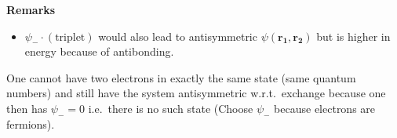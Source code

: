 \newpar{}
\textbf{Remarks}
\begin{itemize}
    \item $\psi_{-}\cdot \left(\text{triplet}\right)$ would also lead to antisymmetric $\psi(\mathbf{r_1},\mathbf{r_2})$ but is higher in energy because of antibonding.
\end{itemize}

\newpar{}

One cannot have two electrons in exactly the same state (same quantum numbers) and still have the system antisymmetric w.r.t.\ exchange because one then has $\psi_{-}=0$ i.e.\ there is no such state (Choose $\psi_{-}$ because electrons are fermions).








